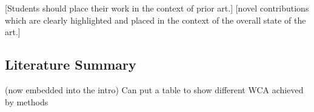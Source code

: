 [Students should place their work in the context of prior art.]
[novel contributions which are clearly highlighted and placed in the context of the overall state of the art.]

\subsection{Literature Summary }
(now embedded into the intro)
Can put a table to show different WCA achieved by methods
